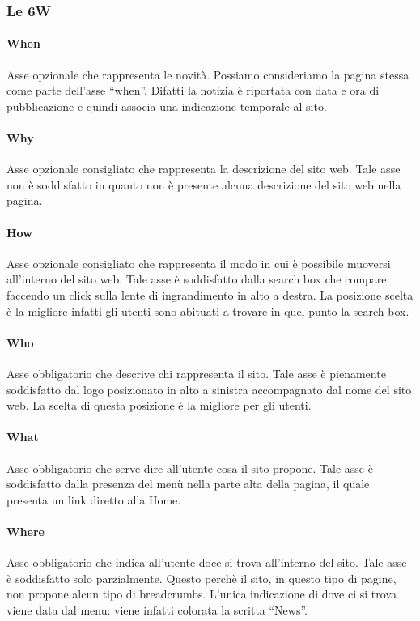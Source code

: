 \documentclass[../ProgettoTecWeb2.tex]{subfiles}
\begin{document}
		\subsubsection{Le 6W}
			\paragraph{When}
			Asse opzionale che rappresenta le novità. Possiamo consideriamo la pagina stessa come parte dell'asse ``when''. Difatti la notizia è riportata con data e ora di pubblicazione e quindi associa una indicazione temporale al sito.

			\paragraph{Why}
			Asse opzionale consigliato che rappresenta la descrizione del sito web. Tale asse non è soddisfatto in quanto non è presente alcuna descrizione del sito web nella pagina.

			\paragraph{How}
			Asse opzionale consigliato che rappresenta il modo in cui è possibile muoversi all'interno del sito web. Tale asse è soddisfatto dalla search box che compare faccendo un click sulla lente di ingrandimento in alto a destra. La posizione scelta è la migliore infatti gli utenti sono abituati a trovare in quel punto la search box. 
			
			\paragraph{Who}
			Asse obbligatorio che descrive chi rappresenta il sito. Tale asse è pienamente soddisfatto dal logo posizionato in alto a sinistra accompagnato dal nome del sito web. La scelta di questa posizione è la migliore per gli utenti.

			\paragraph{What}
			Asse obbligatorio che serve dire all'utente cosa il sito propone. Tale asse è soddisfatto dalla presenza del menù nella parte alta della pagina, il quale presenta un link diretto alla Home.

			\paragraph{Where}
			Asse obbligatorio che indica all'utente doce si trova all'interno del sito. Tale asse è soddisfatto solo parzialmente. Questo perchè il sito, in questo tipo di pagine, non propone alcun tipo di breadcrumbs. L'unica indicazione di dove ci si trova viene data dal menu: viene infatti colorata la scritta ``News''.
\end{document}
